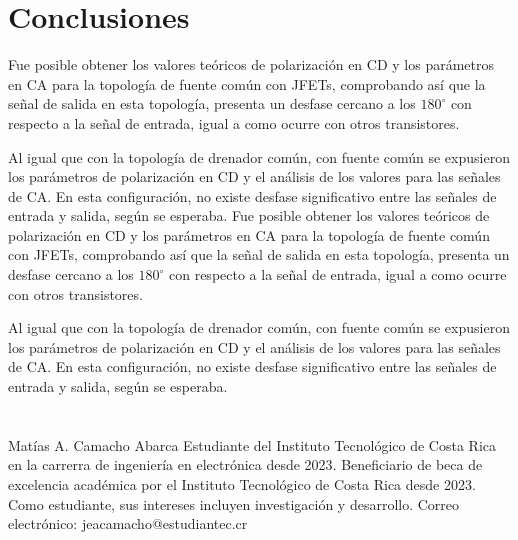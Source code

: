 \documentclass[journal]{IEEEtran}
\begin{document}
\section{Conclusiones}
Fue posible obtener los valores teóricos de polarización en CD y los parámetros en CA para la topología de fuente
común con JFETs, comprobando así que la señal de salida en esta topología, presenta un desfase cercano a los $180^\circ$
con respecto a la señal de entrada, igual a como ocurre con otros transistores.

Al igual que con la topología de drenador común, con fuente común se expusieron los parámetros de polarización en CD
y el análisis de los valores para las señales de CA. En esta configuración, no existe desfase significativo entre las 
señales de entrada y salida, según se esperaba. 
Fue posible obtener los valores teóricos de polarización en CD y los parámetros en CA para la topología de fuente
común con JFETs, comprobando así que la señal de salida en esta topología, presenta un desfase cercano a los $180^\circ$
con respecto a la señal de entrada, igual a como ocurre con otros transistores.

Al igual que con la topología de drenador común, con fuente común se expusieron los parámetros de polarización en CD
y el análisis de los valores para las señales de CA. En esta configuración, no existe desfase significativo entre las 
señales de entrada y salida, según se esperaba. 
\appendices

\section{}

\begin{IEEEbiographynophoto}{Matías A. Camacho Abarca}
        Estudiante del Instituto Tecnológico de Costa Rica en la carrerra de ingeniería en electrónica desde
        2023. Beneficiario de beca de excelencia académica por el Instituto Tecnológico de
        Costa Rica desde 2023. Como estudiante, sus
        intereses incluyen investigación y desarrollo.
        Correo electrónico: jeacamacho@estudiantec.cr
\end{IEEEbiographynophoto}
\end{document}
